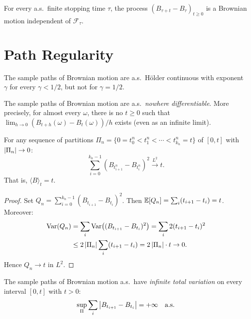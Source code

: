 \begin{proposition}
For every a.s.\ finite stopping time $\tau$, the process
$(B_{\tau + t} - B_{\tau})_{t \geq 0}$ is a Brownian motion independent of
$\mathcal{F}_{\tau}$.
\end{proposition}

\section{Path Regularity}

\begin{theorem}
\label{thm:holder}
The sample paths of Brownian motion are a.s.\ H\"older continuous with exponent
$\gamma$ for every $\gamma < 1/2$, but not for $\gamma = 1/2$.
\end{theorem}

\begin{theorem}
\label{thm:nowhere_diff}
The sample paths of Brownian motion are a.s.\ \emph{nowhere differentiable}.
More precisely, for almost every $\omega$, there is no $t \geq 0$ such that
$\lim_{h \to 0} (B_{t+h}(\omega) - B_t(\omega))/h$ exists (even as an infinite
limit).
\end{theorem}

\begin{theorem}
\label{thm:quad_var_bm}
For any sequence of partitions $\Pi_n = \{0 = t_0^n < t_1^n < \cdots < t_{k_n}^n = t\}$
of $[0, t]$ with $\left| \Pi_n \right| \to 0$:
\[
  \sum_{i=0}^{k_n - 1} (B_{t_{i+1}^n} - B_{t_i^n})^2 \xrightarrow{L^2} t.
\]
That is, $\langle B \rangle_t = t$.
\end{theorem}

\begin{proof}
Set $Q_n = \sum_{i=0}^{k_n-1} (B_{t_{i+1}} - B_{t_i})^2$. Then
$\mathbb{E}[Q_n] = \sum_i (t_{i+1} - t_i) = t$. Moreover:
\begin{align*}
  \mathrm{Var}(Q_n) &= \sum_i \mathrm{Var}\bigl((B_{t_{i+1}} - B_{t_i})^2\bigr)
  = \sum_i 2(t_{i+1} - t_i)^2 \\
  &\leq 2 \left| \Pi_n \right| \sum_i (t_{i+1} - t_i) = 2\left| \Pi_n \right| \cdot t \to 0.
\end{align*}
Hence $Q_n \to t$ in $L^2$.
\end{proof}

\begin{theorem}
\label{thm:total_var}
The sample paths of Brownian motion a.s.\ have \emph{infinite total variation}
on every interval $[0, t]$ with $t > 0$:
\[
  \sup_{\Pi} \sum_i \left| B_{t_{i+1}} - B_{t_i} \right| = +\infty \quad \text{a.s.}
\]
\end{theorem}

